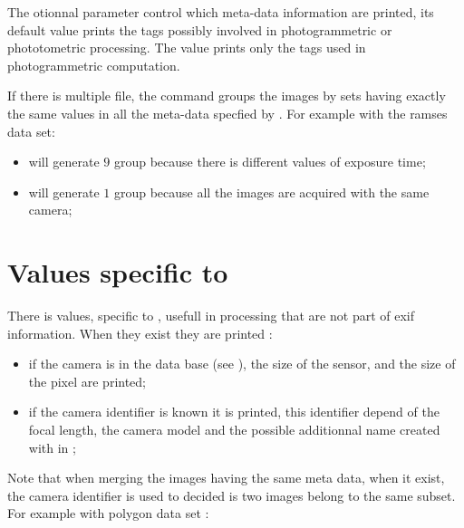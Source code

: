 \documentclass[a4paper]{article}
\begin{document}
The otionnal parameter   control which meta-data information 
are printed, its default value   prints the tags possibly involved in photogrammetric
or phototometric processing. 
The value   prints only the tags used in photogrammetric computation.

If there is multiple file, the command groups the images by sets having exactly the same values
in all the meta-data specfied by  . For example with the ramses data set:

\begin{itemize}
   \item  {} will generate $9$ group because there is different values of
          exposure time;
   \item  {} will generate $1$ group because all the images
          are acquired with the same camera;
\end{itemize}


\section{Values specific to \MMVII}

There is values,  specific to \MMVII, usefull in processing that are not part
of exif information. When they exist they are printed :

\begin{itemize}
    \item if the  camera is in the data base (see  ), the size
            of the sensor, and the size of the pixel are printed;

    \item if the  camera identifier is known it is printed, this identifier depend
          of the focal length, the camera model and the possible additionnal name created
          with  in   ;
\end{itemize}

Note that when merging the images having the same meta data, when it 
exist, the camera identifier is used to decided is two images belong to the same subset.
For example with polygon data set :
\end{document}
